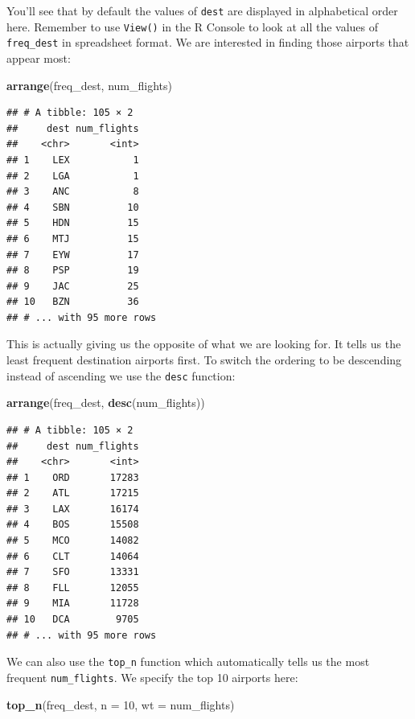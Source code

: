 \documentclass[]{tufte-book}
\newenvironment{Shaded}{\begin{snugshade}}{\end{snugshade}}
\newcommand{\KeywordTok}[1]{\textcolor[rgb]{0.13,0.29,0.53}{\textbf{{#1}}}}
\newcommand{\DataTypeTok}[1]{\textcolor[rgb]{0.13,0.29,0.53}{{#1}}}
\newcommand{\DecValTok}[1]{\textcolor[rgb]{0.00,0.00,0.81}{{#1}}}
\newcommand{\NormalTok}[1]{{#1}}
\begin{document}
You'll see that by default the values of \texttt{dest} are displayed in
alphabetical order here. Remember to use \texttt{View()} in the R
Console to look at all the values of \texttt{freq\_dest} in spreadsheet
format. We are interested in finding those airports that appear most:

\begin{Shaded}
\begin{Highlighting}[]
\KeywordTok{arrange}\NormalTok{(freq_dest, num_flights)}
\end{Highlighting}
\end{Shaded}

\begin{verbatim}
## # A tibble: 105 × 2
##     dest num_flights
##    <chr>       <int>
## 1    LEX           1
## 2    LGA           1
## 3    ANC           8
## 4    SBN          10
## 5    HDN          15
## 6    MTJ          15
## 7    EYW          17
## 8    PSP          19
## 9    JAC          25
## 10   BZN          36
## # ... with 95 more rows
\end{verbatim}

This is actually giving us the opposite of what we are looking for. It
tells us the least frequent destination airports first. To switch the
ordering to be descending instead of ascending we use the \texttt{desc}
function:

\begin{Shaded}
\begin{Highlighting}[]
\KeywordTok{arrange}\NormalTok{(freq_dest, }\KeywordTok{desc}\NormalTok{(num_flights))}
\end{Highlighting}
\end{Shaded}

\begin{verbatim}
## # A tibble: 105 × 2
##     dest num_flights
##    <chr>       <int>
## 1    ORD       17283
## 2    ATL       17215
## 3    LAX       16174
## 4    BOS       15508
## 5    MCO       14082
## 6    CLT       14064
## 7    SFO       13331
## 8    FLL       12055
## 9    MIA       11728
## 10   DCA        9705
## # ... with 95 more rows
\end{verbatim}

We can also use the \texttt{top\_n} function which automatically tells
us the most frequent \texttt{num\_flights}. We specify the top 10
airports here:

\begin{Shaded}
\begin{Highlighting}[]
\KeywordTok{top_n}\NormalTok{(freq_dest, }\DataTypeTok{n =} \DecValTok{10}\NormalTok{, }\DataTypeTok{wt =} \NormalTok{num_flights)}
\end{Highlighting}
\end{Shaded}
\end{document}
